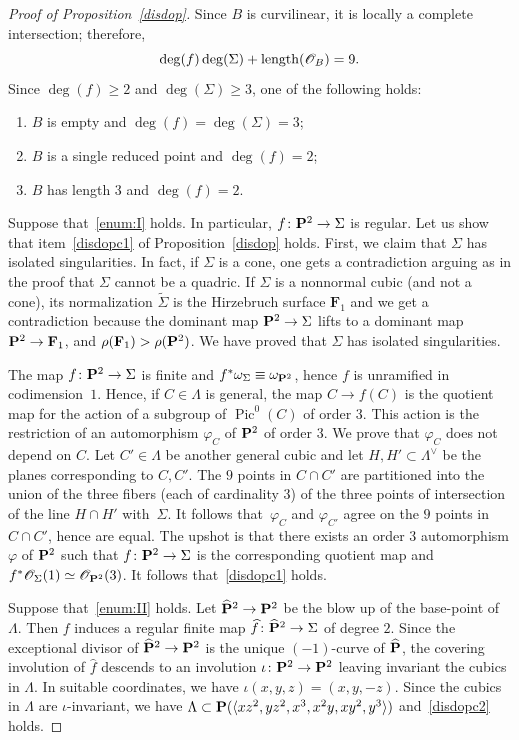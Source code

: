 \documentclass[11pt]{article}
\let\mathcal\mathscr
\theoremstyle{definition}
\newcommand\F{{\mathbf F}}
\newcommand\cO{\mathcal{O}}\let\OO\cO
\let\wh\widehat
\let\wt\widetilde
\let\la\langle
\let\ra\rangle
\let\cong\simeq
\DeclareMathOperator{\len}{length}
\DeclareMathOperator{\Pic}{Pic}
\begin{document}
\begin{proof}[Proof of Proposition~\ref{disdop}]
Since $B$ is curvilinear, it is locally a complete intersection; therefore,\vspace*{-3pt}\enlargethispage{1\baselineskip}%
\[
\deg( f)\deg (\Sigma)+\len(\cO_{B})=9.\vspace*{-3pt}
\]
Since $\deg (f)\ge 2$ and $\deg( \Sigma)\ge 3$, one of the following holds:
\begin{enumerate}\renewcommand{\theenumi}{\Roman{enumi}}
\item\label{enum:I}
$ B$ is empty and $\deg( f)=\deg(\Sigma)=3$;
\item\label{enum:II}
$ B$ is a single reduced point and $\deg( f)=2$;
\item\label{enum:III}
$ B$ has length $3$ and $\deg( f)=2$.
\end{enumerate}
Suppose that~\eqref{enum:I} holds. In particular, $f\colon \PP^2 \to\Sigma$ is regular. Let us show that item~\eqref{disdopc1} of Proposition~\ref{disdop} holds. First, we claim that $\Sigma$ has isolated singularities. In fact, if $\Sigma$ is a cone, one gets a contradiction arguing as in the proof that $\Sigma$ cannot be a quadric. If $\Sigma$ is a nonnormal cubic (and not a cone), its normalization $\wt{\Sigma}$ is the Hirzebruch surface $\F_1$ and we get a contradiction because the dominant map $\PP^2\to\Sigma$ lifts to a dominant map $\PP^2\to \F_1$, and $\rho(\F_1)>\rho(\PP^2)$.
We have proved that $\Sigma$ has isolated singularities.

The map $f\colon\PP^2\to\Sigma$ is finite and $f^{*}\omega_{\Sigma}\equiv\omega_{\PP^2}$, hence $f$ is unramified in codimension~$1$. Hence, if $C\in\Lambda$ is general, the map $C\to f(C)$ is the quotient map for the action of a subgroup of $\Pic^0(C)$ of order $3$. This action is the restriction of an automorphism $\varphi_C$ of $\PP^2$ of order $3$. We prove that $\varphi_C$ does not depend on $C$. Let $C'\in\Lambda$ be another general cubic and let $H,H'\subset\Lambda^{\!\vee}$ be the planes corresponding to $C,C'$. The $9$ points in $C\cap C'$ are partitioned into the union of the three fibers (each of cardinality $3$) of the three points of intersection of the line $H\cap H'$ with~$\Sigma$. It follows that~$\varphi_C$ and $\varphi_{C'}$ agree on the $9$ points in $C\cap C'$, hence are equal. The upshot is that there exists an order $3$ automorphism $\varphi$ of $\PP^2$ such that $f\colon\PP^2\to\Sigma$ is the corresponding quotient map and $f^{*}\cO_{\Sigma}(1)\cong\cO_{\PP^2}(3)$. It follows that~\eqref{disdopc1} holds.

Suppose that~\eqref{enum:II} holds. Let $\wh{\PP}^2\to\PP^2$ be the blow up of the base-point of $\Lambda$. Then $f$ induces a regular finite map
$\wh{f}\colon \wh{\PP}^2\to \Sigma$ of degree $2$. Since the exceptional divisor of $\wh{\PP}^2\to\PP^2$ is the unique $(-1)$-curve of $\wh{\PP}$, the covering involution of $\wh{f}$ descends to an involution $\iota\colon\PP^2\to\PP^2$ leaving invariant the cubics in $\Lambda$. In suitable coordinates, we have
$\iota(x,y,z)=(x,y,-z)$. Since the cubics in $\Lambda$ are ${\iota}$-invariant, we have
$\Lambda\subset\PP(\la xz^2,yz^2,x^3,x^2y,xy^2,y^3\ra)$ and~\eqref{disdopc2} holds.


\end{proof}
\end{document}
